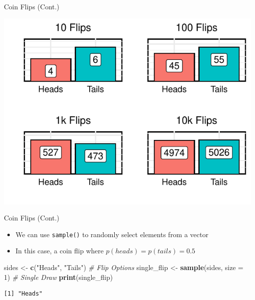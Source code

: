 \documentclass[
  ignorenonframetext,
]{beamer}
\newenvironment{Shaded}{\begin{snugshade}}{\end{snugshade}}
\newcommand{\AttributeTok}[1]{\textcolor[rgb]{0.13,0.29,0.53}{#1}}
\newcommand{\CommentTok}[1]{\textcolor[rgb]{0.56,0.35,0.01}{\textit{#1}}}
\newcommand{\DecValTok}[1]{\textcolor[rgb]{0.00,0.00,0.81}{#1}}
\newcommand{\FunctionTok}[1]{\textcolor[rgb]{0.13,0.29,0.53}{\textbf{#1}}}
\newcommand{\NormalTok}[1]{#1}
\newcommand{\OtherTok}[1]{\textcolor[rgb]{0.56,0.35,0.01}{#1}}
\newcommand{\StringTok}[1]{\textcolor[rgb]{0.31,0.60,0.02}{#1}}
\providecommand{\tightlist}{%
  \setlength{\itemsep}{0pt}\setlength{\parskip}{0pt}}
\begin{document}
\begin{frame}{Coin Flips (Cont.)}
\label{coin-flips-cont.}
\small

\begin{center}\includegraphics{Class_2_Intermediate_R_Programming_files/figure-beamer/coin_flips_sim-1} \end{center}
\end{frame}

\begin{frame}[fragile]{Coin Flips (Cont.)}
\label{coin-flips-cont.-1}
\begin{itemize}
\tightlist
\item
  We can use \texttt{sample()} to randomly select elements from a vector
\item
  In this case, a coin flip where \(p(heads) = p(tails) = 0.5\)
\end{itemize}

\begin{Shaded}
\begin{Highlighting}[]
\NormalTok{sides }\OtherTok{\textless{}{-}} \FunctionTok{c}\NormalTok{(}\StringTok{"Heads"}\NormalTok{, }\StringTok{"Tails"}\NormalTok{)  }\CommentTok{\# Flip Options}
\NormalTok{single\_flip }\OtherTok{\textless{}{-}} \FunctionTok{sample}\NormalTok{(sides, }\AttributeTok{size =} \DecValTok{1}\NormalTok{)  }\CommentTok{\# Single Draw}
\FunctionTok{print}\NormalTok{(single\_flip)}
\end{Highlighting}
\end{Shaded}

\begin{verbatim}
[1] "Heads"
\end{verbatim}
\end{frame}
\end{document}
